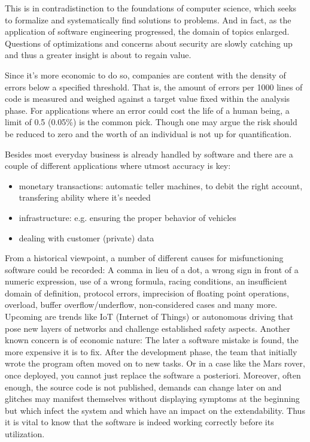 
This is in contradistinction to the foundations of computer science, which seeks to formalize and systematically find solutions to problems. And in fact, as the application of software engineering progressed, the domain of topics enlarged. Questions of optimizations and concerns about security are slowly catching up and thus a greater insight is about to regain value.

Since it's more economic to do so, companies are content with the density of errors below a specified threshold. That is, the amount of errors per 1000 lines of code is measured and weighed against a target value fixed within the analysis phase. For applications where an error could cost the life of a human being, a limit of 0.5 (0.05\%) is the common pick. Though one may argue the risk should be reduced to zero and the worth of an individual is not up for quantification.

Besides most everyday business is already handled by software and there are a couple of different applications where utmost accuracy is key:

\begin{itemize}
	\item monetary transactions: automatic teller machines, to debit the right account, transfering ability where it's needed
	\item infrastructure: e.g. ensuring the proper behavior of vehicles
	\item dealing with customer (private) data
\end{itemize}

From a historical viewpoint, a number of different causes for misfunctioning software could be recorded: A comma in lieu of a dot, a wrong sign in front of a numeric expression, use of a wrong formula, racing conditions, an insufficient domain of definition, protocol errors, imprecision of floating point operations, overload, buffer overflow/underflow, non-considered cases and many more. Upcoming are trends like IoT (Internet of Things) or autonomous driving that pose new layers of networks and challenge established safety aspects. Another known concern is of economic nature: The later a software mistake is found, the more expensive it is to fix. After the development phase, the team that initially wrote the program often moved on to new tasks. Or in a case like the Mars rover, once deployed, you cannot just replace the software a posteriori. Moreover, often enough, the source code is not published, demands can change later on and glitches may manifest themselves without displaying symptoms at the beginning but which infect the system and which have an impact on the extendability. Thus it is vital to know that the software is indeed working correctly before its utilization.

